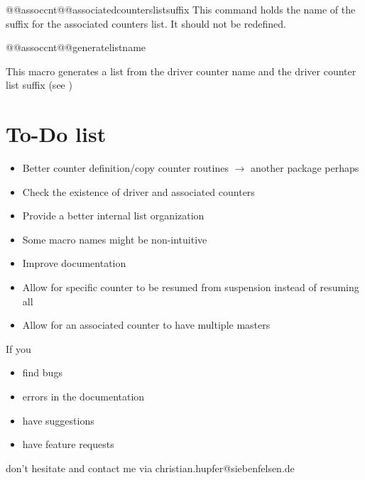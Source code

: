 \documentclass[12pt,paper=a4]{ltxdoc}
\begin{document}
\begin{docCommand}{@@assoccnt@@associatedcounterslistsuffix}{}
This command holds the name of the suffix for the associated counters list. It should not be redefined.
\end{docCommand}


\begin{docCommand}{@@assoccnt@@generatelistname}{}

This macro generates a list from the driver counter name and the driver counter list suffix (see )

\makeatletter
\begin{dispExample}
\end{dispExample}
\makeatother

\end{docCommand}


\clearpage

\section{To-Do list}

\begin{itemize}
\item Better counter definition/copy counter routines \(\longrightarrow\) another package perhaps
\item Check the existence of driver and associated counters
\item Provide a better internal list organization
\item Some macro names might be non-intuitive
\item Improve documentation
\item Allow for specific counter to be resumed from suspension instead of resuming all
\item Allow for an associated counter to have multiple masters 
\end{itemize}

If you 

\begin{itemize}
  \item find bugs
  \item errors in the documentation
  \item have suggestions
  \item have feature requests
\end{itemize}

don't hesitate and contact me via \makeatletter christian.hupfer@siebenfelsen.de\makeatother
\end{document}
